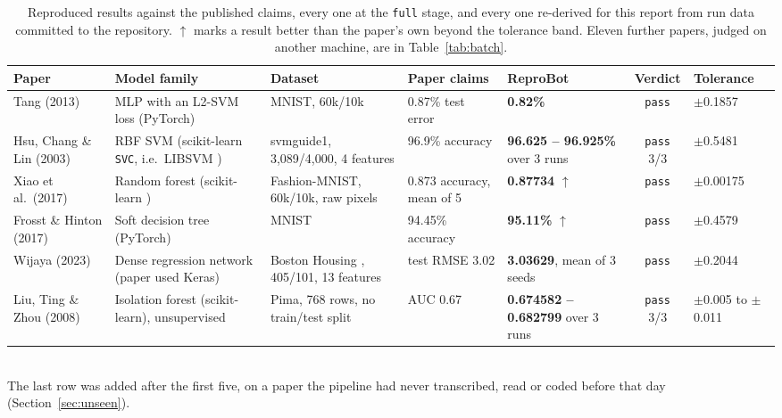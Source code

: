 \documentclass[10pt,twocolumn]{article}
\newcommand{\squeeze}{\setlength{\tabcolsep}{4pt}}
\begin{document}
\begin{table}[tbp]
\centering
\small
\caption{Reproduced results against the published claims, every one at the \texttt{full} stage,
and every one re-derived for this report from run data committed to the repository. $\uparrow$
marks a result better than the paper's own beyond the tolerance band. Eleven further papers,
judged on another machine, are in Table~\ref{tab:batch}.}
\label{tab:fidelity}
\squeeze
\begin{tabular}{L{0.14\textwidth}L{0.14\textwidth}L{0.12\textwidth}L{0.095\textwidth}L{0.105\textwidth}cL{0.095\textwidth}}
\toprule
Paper & Model family & Dataset & Paper claims & ReproBot & Verdict & Tolerance \\
\midrule
Tang (2013) \cite{tang2013dlsvm} & MLP with an L2-SVM loss (PyTorch) & MNIST, 60k/10k & 0.87\%
  test error & \textbf{0.82\%} & \texttt{pass} & $\pm$0.1857 \\
Hsu, Chang \& Lin (2003) \cite{hsu2003guide} & RBF SVM (scikit-learn \texttt{SVC}, i.e.\ LIBSVM
  \cite{chang2011libsvm}) & svmguide1, 3{,}089/4{,}000, 4 features & 96.9\% accuracy &
  \textbf{96.625 -- 96.925\%} over 3 runs & \texttt{pass} 3/3 & $\pm$0.5481 \\
Xiao et al.\ (2017) \cite{xiao2017fashion} & Random forest (scikit-learn
  \cite{pedregosa2011sklearn}) & Fashion-MNIST, 60k/10k, raw pixels & 0.873 accuracy, mean of 5 &
  \textbf{0.87734} $\uparrow$ & \texttt{pass} & $\pm$0.00175 \\
Frosst \& Hinton (2017) \cite{frosst2017soft} & Soft decision tree (PyTorch) & MNIST & 94.45\%
  accuracy & \textbf{95.11\%} $\uparrow$ & \texttt{pass} & $\pm$0.4579 \\
Wijaya (2023) \cite{wijaya2023housing} & Dense regression network (paper used Keras) & Boston
  Housing \cite{harrison1978hedonic}, 405/101, 13 features & test RMSE 3.02 & \textbf{3.03629},
  mean of 3 seeds & \texttt{pass} & $\pm$0.2044 \\
\midrule
Liu, Ting \& Zhou (2008) \cite{liu2008iforest} & Isolation forest (scikit-learn), unsupervised &
  Pima, 768 rows, no train/test split & AUC 0.67 & \textbf{0.674582 -- 0.682799} over 3 runs &
  \texttt{pass} 3/3 & $\pm$0.005 to $\pm$0.011 \\
\bottomrule
\end{tabular}
\\[2pt]
{\small The last row was added after the first five, on a paper the pipeline had never
transcribed, read or coded before that day (Section~\ref{sec:unseen}).}
\end{table}
\end{document}
